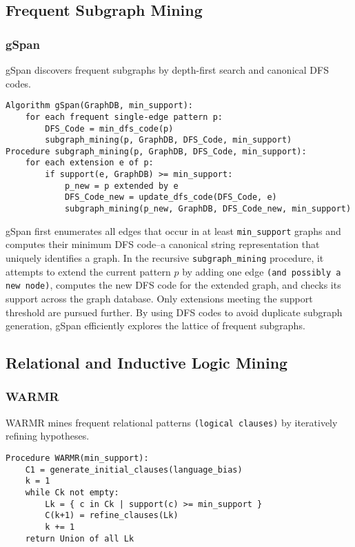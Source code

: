 \documentclass{article}
\begin{document}
\subsection{Frequent Subgraph Mining}

\subsubsection{gSpan}

gSpan \cite{yan2002gspan} discovers frequent subgraphs by depth-first search and canonical DFS codes.

\begin{verbatim}
Algorithm gSpan(GraphDB, min_support):
    for each frequent single-edge pattern p:
        DFS_Code = min_dfs_code(p)
        subgraph_mining(p, GraphDB, DFS_Code, min_support)
Procedure subgraph_mining(p, GraphDB, DFS_Code, min_support):
    for each extension e of p:
        if support(e, GraphDB) >= min_support:
            p_new = p extended by e
            DFS_Code_new = update_dfs_code(DFS_Code, e)
            subgraph_mining(p_new, GraphDB, DFS_Code_new, min_support)
\end{verbatim}

gSpan first enumerates all edges that occur in at least \texttt{min\_support} graphs and computes their minimum DFS code--a canonical string representation that uniquely identifies a graph.  In the recursive \texttt{subgraph\_mining} procedure, it attempts to extend the current pattern $p$ by adding one edge \texttt{(and possibly a new node)}, computes the new DFS code for the extended graph, and checks its support across the graph database.  Only extensions meeting the support threshold are pursued further.  By using DFS codes to avoid duplicate subgraph generation, gSpan efficiently explores the lattice of frequent subgraphs.

\subsection{Relational and Inductive Logic Mining}

\subsubsection{WARMR}

WARMR \cite{dehaspe1999frequent} mines frequent relational patterns \texttt{(logical clauses)} by iteratively refining hypotheses.

\begin{verbatim}
Procedure WARMR(min_support):
    C1 = generate_initial_clauses(language_bias)
    k = 1
    while Ck not empty:
        Lk = { c in Ck | support(c) >= min_support }
        C(k+1) = refine_clauses(Lk)
        k += 1
    return Union of all Lk
\end{verbatim}
\end{document}
